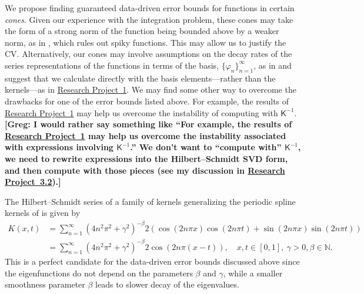 \documentclass[11pt]{NSFamsart}
\newcommand{\mK}{\mathsf{K}}
\newcommand{\refproba}{\hyperref[SectHSSVD]{Research Project~1}\xspace}
\newcommand{\refprobcb}{\hyperref[parestsubsec]{Research Project~3.2}\xspace}
\begin{document}
We propose finding guaranteed data-driven error bounds for functions in certain  \emph{cones}.  Given our experience with the integration problem, these cones may take the form of a strong norm of the function being bounded above by a weaker norm, as in \cite{HicEtal14b}, which rules out spiky functions.  This may allow us to justify the CV. Alternatively, our cones may involve assumptions on the decay rates of the series representations of the functions in terms of the basis, $\{\varphi_n\}_{n=1}^{\infty}$, as in \cite{HicJim16a,JimHic16a} and suggest that we calculate directly with the basis elements---rather than the kernels---as in \refproba.  We may find some other way to overcome the drawbacks for one of the error bounds listed above.  For example, the results of \refproba may help us overcome the instability of computing with $\mK^{-1}$. {\bf [Greg: I would rather say something like ``For example, the results of \refproba may help us overcome the instability associated with expressions involving $\mK^{-1}$.'' We don't want to ``compute with'' $\mK^{-1}$, we need to rewrite expressions into the Hilbert--Schmidt SVD form, and then compute with those pieces (see my discussion in \refprobcb).]}


The Hilbert--Schmidt series of a family of kernels generalizing the periodic spline kernels of \citep[Chapt.~2]{Wah90} is given by
\begin{align}\label{PeriodicKernel}
K(x,t) &= \sum_{n=1}^\infty \left(4n^2\pi^2 + \gamma^2\right)^{-\beta} 2\left(\cos (2n\pi x) \cos (2n\pi t) + \sin (2n\pi x) \sin (2n\pi t)\right) \\
 &= \sum_{n=1}^\infty \left(4n^2\pi^2 + \gamma^2\right)^{-\beta} 2\cos\left(2n\pi(x-t)\right), \quad x,t \in [0,1],\ \gamma>0, \beta \in \mathbb{N}. \nonumber
\end{align}
This is a perfect candidate for the data-driven error bounds discussed above since the eigenfunctions do not depend on the parameters $\beta$ and $\gamma$, while a smaller smoothness parameter $\beta$ leads to slower decay of the eigenvalues.
\end{document}
